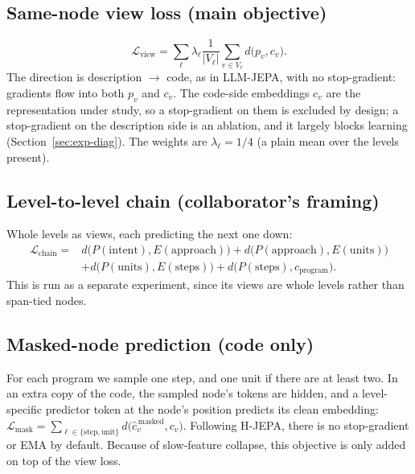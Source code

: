\documentclass[11pt]{article}
\newcommand{\Lcal}{\mathcal{L}}
\begin{document}
\subsection{Same-node view loss (main objective)}
\label{sec:loss-view}
\begin{equation}
\Lcal_{\text{view}} = \sum_{\ell} \lambda_\ell \frac{1}{|V_\ell|} \sum_{v\in V_\ell} d\bigl(p_v, c_v\bigr).
\end{equation}
The direction is description $\to$ code, as in LLM-JEPA, with no stop-gradient: gradients flow into both $p_v$ and
$c_v$. The code-side embeddings $c_v$ are the representation under study, so a stop-gradient on them is excluded by
design; a stop-gradient on the description side is an ablation, and it largely blocks learning
(Section~\ref{sec:exp-diag}). The weights are $\lambda_\ell=1/4$ (a plain mean over the levels present).

\subsection{Level-to-level chain (collaborator's framing)}
Whole levels as views, each predicting the next one down:
\begin{equation}
\begin{split}
\Lcal_{\text{chain}} ={}& d\bigl(P(\text{intent}), E(\text{approach})\bigr)
 + d\bigl(P(\text{approach}), E(\text{units})\bigr)\\
 &+ d\bigl(P(\text{units}), E(\text{steps})\bigr)
 + d\bigl(P(\text{steps}), c_{\text{program}}\bigr).
\end{split}
\end{equation}
This is run as a separate experiment, since its views are whole levels rather than span-tied nodes.

\subsection{Masked-node prediction (code only)}
\label{sec:loss-mask}
For each program we sample one step, and one unit if there are at least two. In an extra copy of the code, the
sampled node's tokens are hidden, and a level-specific predictor token at the node's position predicts its clean
embedding:
$\Lcal_{\text{mask}} = \sum_{\ell\in\{\text{step},\text{unit}\}} d\bigl(\hat c^{\,\text{masked}}_v, c_v\bigr)$.
Following H-JEPA, there is no stop-gradient or EMA by default. Because of slow-feature collapse, this objective is
only added on top of the view loss.
\end{document}
